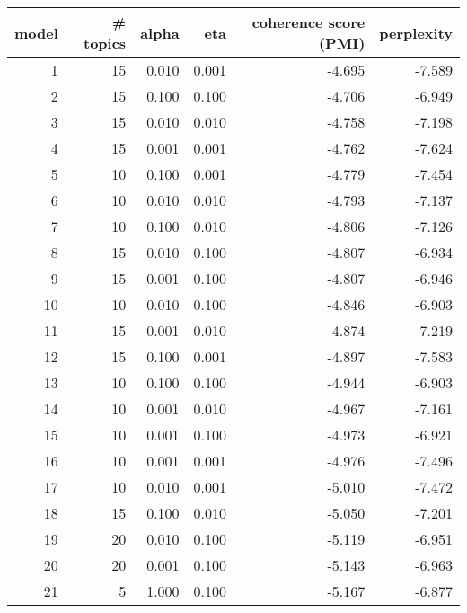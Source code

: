 \begin{tabular}{rrrrrr}
\toprule
 model &  \# topics &  alpha &   eta &  coherence score (PMI) &  perplexity \\
\midrule
     1 &        15 &  0.010 & 0.001 &                 -4.695 &      -7.589 \\
     2 &        15 &  0.100 & 0.100 &                 -4.706 &      -6.949 \\
     3 &        15 &  0.010 & 0.010 &                 -4.758 &      -7.198 \\
     4 &        15 &  0.001 & 0.001 &                 -4.762 &      -7.624 \\
     5 &        10 &  0.100 & 0.001 &                 -4.779 &      -7.454 \\
     6 &        10 &  0.010 & 0.010 &                 -4.793 &      -7.137 \\
     7 &        10 &  0.100 & 0.010 &                 -4.806 &      -7.126 \\
     8 &        15 &  0.010 & 0.100 &                 -4.807 &      -6.934 \\
     9 &        15 &  0.001 & 0.100 &                 -4.807 &      -6.946 \\
    10 &        10 &  0.010 & 0.100 &                 -4.846 &      -6.903 \\
    11 &        15 &  0.001 & 0.010 &                 -4.874 &      -7.219 \\
    12 &        15 &  0.100 & 0.001 &                 -4.897 &      -7.583 \\
    13 &        10 &  0.100 & 0.100 &                 -4.944 &      -6.903 \\
    14 &        10 &  0.001 & 0.010 &                 -4.967 &      -7.161 \\
    15 &        10 &  0.001 & 0.100 &                 -4.973 &      -6.921 \\
    16 &        10 &  0.001 & 0.001 &                 -4.976 &      -7.496 \\
    17 &        10 &  0.010 & 0.001 &                 -5.010 &      -7.472 \\
    18 &        15 &  0.100 & 0.010 &                 -5.050 &      -7.201 \\
    19 &        20 &  0.010 & 0.100 &                 -5.119 &      -6.951 \\
    20 &        20 &  0.001 & 0.100 &                 -5.143 &      -6.963 \\
    21 &         5 &  1.000 & 0.100 &                 -5.167 &      -6.877 \\

\end{tabular}
